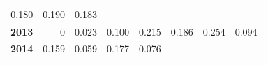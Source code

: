 \documentclass[]{article}
\begin{document}
\begin{longtable}[]{@{}rrrrrrrr@{}}
\begin{minipage}[t]{0.09\columnwidth}
0.180\strut
\end{minipage} & \begin{minipage}[t]{0.08\columnwidth}\raggedleft\strut
0.190\strut
\end{minipage} & \begin{minipage}[t]{0.10\columnwidth}\raggedleft\strut
0.183\strut
\end{minipage}\tabularnewline
\begin{minipage}[t]{0.08\columnwidth}\raggedleft\strut
\textbf{2013}\strut
\end{minipage} & \begin{minipage}[t]{0.10\columnwidth}\raggedleft\strut
0\strut
\end{minipage} & \begin{minipage}[t]{0.11\columnwidth}\raggedleft\strut
0.023\strut
\end{minipage} & \begin{minipage}[t]{0.08\columnwidth}\raggedleft\strut
0.100\strut
\end{minipage} & \begin{minipage}[t]{0.14\columnwidth}\raggedleft\strut
0.215\strut
\end{minipage} & \begin{minipage}[t]{0.09\columnwidth}\raggedleft\strut
0.186\strut
\end{minipage} & \begin{minipage}[t]{0.08\columnwidth}\raggedleft\strut
0.254\strut
\end{minipage} & \begin{minipage}[t]{0.10\columnwidth}\raggedleft\strut
0.094\strut
\end{minipage}\tabularnewline
\begin{minipage}[t]{0.08\columnwidth}\raggedleft\strut
\textbf{2014}\strut
\end{minipage} & \begin{minipage}[t]{0.10\columnwidth}\raggedleft\strut
0.159\strut
\end{minipage} & \begin{minipage}[t]{0.11\columnwidth}\raggedleft\strut
0.059\strut
\end{minipage} & \begin{minipage}[t]{0.08\columnwidth}\raggedleft\strut
0.177\strut
\end{minipage} & \begin{minipage}[t]{0.14\columnwidth}\raggedleft\strut
0.076\strut
\end{minipage} & \begin{minipage}[t]{0.09\columnwidth}\raggedleft\strut

\end{minipage}
\end{longtable}
\end{document}

